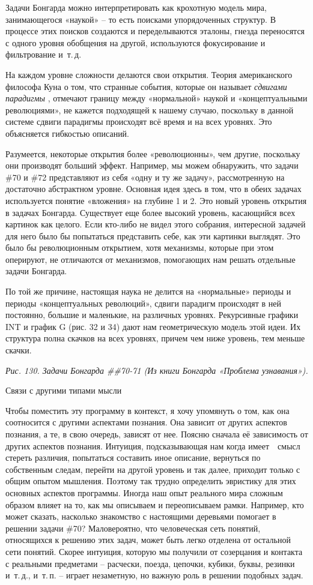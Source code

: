\documentclass[../main.tex]{subfiles}
\begin{document}
Задачи Бонгарда можно интерпретировать как крохотную модель мира, занимающегося «наукой» \--- то есть поисками упорядоченных структур. В процессе этих поисков создаются и переделываются эталоны, гнезда переносятся с одного уровня обобщения на другой, используются фокусирование и фильтрование и~т.\,д.

На каждом уровне сложности делаются свои открытия. Теория американского философа Куна о том, что странные события, которые он называет \emph{сдвигами парадигмы} , отмечают границу между «нормальной» наукой и «концептуальными революциями», не кажется подходящей к нашему случаю, поскольку в данной системе сдвиги парадигмы происходят всё время и на всех уровнях. Это объясняется гибкостью описаний.

Разумеется, некоторые открытия более «революционны», чем другие, поскольку они производят больший эффект. Например, мы можем обнаружить, что задачи \#70 и \#72 представляют из себя «одну и ту же задачу», рассмотренную на достаточно абстрактном уровне. Основная идея здесь в том, что в обеих задачах используется понятие «вложения» на глубине 1 и 2. Это новый уровень открытия в задачах Бонгарда. Существует еще более высокий уровень, касающийся всех картинок как целого. Если кто-либо не видел этого собрания, интересной задачей для него было бы попытаться представить себе, как эти картинки выглядят. Это было бы революционным открытием, хотя механизмы, которые при этом оперируют, не отличаются от механизмов, помогающих нам решать отдельные задачи Бонгарда.

По той же причине, настоящая наука не делится на «нормальные» периоды и периоды «концептуальных революций», сдвиги парадигм происходят в ней постоянно, большие и маленькие, на различных уровнях. Рекурсивные графики INT и график G (рис. 32 и 34) дают нам геометрическую модель этой идеи. Их структура полна скачков на всех уровнях, причем чем ниже уровень, тем меньше скачки.

\emph{Рис. 130. Задачи Бонгарда \#\#70-71 (Из книги Бонгарда «Проблема узнавания»).}

Связи с другими типами мысли

Чтобы поместить эту программу в контекст, я хочу упомянуть о том, как она соотносится с другими аспектами познания. Она зависит от других аспектов познания, а те, в свою очередь, зависят от нее. Поясню сначала её зависимость от других аспектов познания. Интуиция, подсказывающая нам когда имеет~~смысл стереть различия, попытаться составить иное описание, вернуться по собственным следам, перейти на другой уровень и так далее, приходит только с общим опытом мышления. Поэтому так трудно определить эвристику для этих основных аспектов программы. Иногда наш опыт реального мира сложным образом влияет на то, как мы описываем и переописываем рамки. Например, кто может сказать, насколько знакомство с настоящими деревьями помогает в решении задачи \#70? Маловероятно, что человеческая сеть понятий, относящихся к решению этих задач, может быть легко отделена от остальной сети понятий. Скорее интуиция, которую мы получили от созерцания и контакта с реальными предметами \--- расчески, поезда, цепочки, кубики, буквы, резинки и~т.\,д., и~т.\,п. \--- играет незаметную, но важную роль в решении подобных задач.
\end{document}
